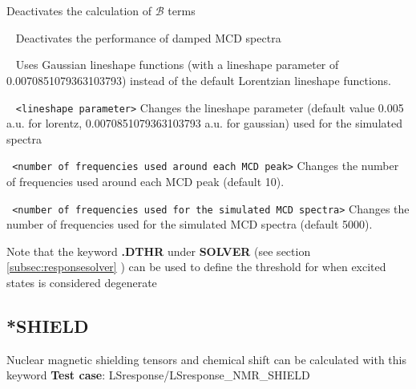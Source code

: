 \begin{description}
Deactivates the calculation of $\mathcal{B}$ terms
\item[\Key{NO DAMPED}] \verb| | \newline
Deactivates the performance of damped MCD spectra
\item[\Key{GAUSSIAN}] \verb| | \newline
Uses Gaussian lineshape functions (with a lineshape parameter of 0.0070851079363103793) instead of the default Lorentzian lineshape functions.
\item[\Key{LINESHAPEPARAM}] \verb| | \newline
\verb|<lineshape parameter>|\newline
Changes the lineshape parameter (default value 0.005 a.u. for lorentz, 0.0070851079363103793 a.u. for gaussian) used for the simulated spectra
\item[\Key{NVECFORPEAK}] \verb| | \newline
\verb|<number of frequencies used around each MCD peak>|\newline
Changes the number of frequencies used around each MCD peak (default 10).
\item[\Key{NSTEPS}] \verb| | \newline
\verb|<number of frequencies used for the simulated MCD spectra>|\newline
Changes the number of frequencies used for the simulated MCD spectra (default 5000).
\end{description}
Note that the keyword {\bf .DTHR} under {\bf *SOLVER} (see section \ref{subsec:responsesolver} ) can be used to define the threshold for when excited states is considered degenerate

\subsection{*SHIELD}\label{nmrshield}
Nuclear magnetic shielding tensors and chemical shift can be calculated with this keyword
{\bf Test case}: LSresponse/LSresponse\_NMR\_SHIELD

